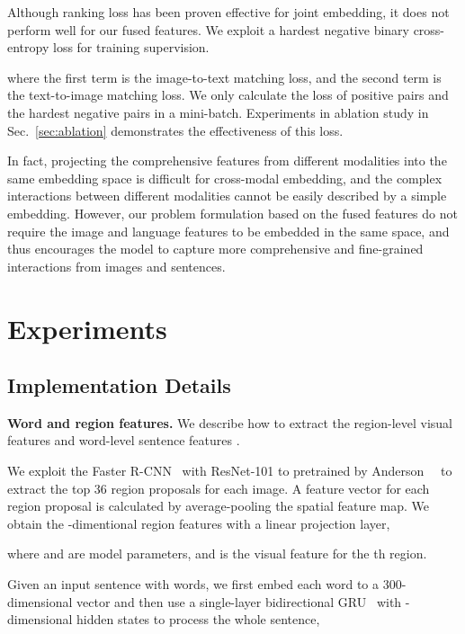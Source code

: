 \documentclass[10pt,twocolumn,letterpaper]{article}
\begin{document}
Although ranking loss has been proven effective for joint embedding, it does not perform well for our fused features. 
We exploit a hardest negative binary cross-entropy loss for training supervision. 

where the first term is the image-to-text matching loss, and the second term is the text-to-image matching loss. We only calculate the loss of positive pairs and the hardest negative pairs in a mini-batch. Experiments in ablation study in Sec.~\ref{sec:ablation} demonstrates the effectiveness of this loss.

In fact, projecting the comprehensive features from different modalities into the same embedding space is difficult for cross-modal embedding, and the complex interactions between different modalities cannot be easily described by a simple embedding. 
However, our problem formulation based on the fused features do not require the image and language features to be embedded in the same space, and thus encourages the model to capture more comprehensive and fine-grained interactions from images and sentences.

\section{Experiments}

\label{sec:experiment}
	


	
\subsection{Implementation Details}
\label{sec:implementdetail}

\noindent\textbf{Word and region features.}
We describe how to extract the region-level visual features  and word-level sentence features .

We exploit the Faster R-CNN~\cite{ren2015faster} with ResNet-101 to pretrained by Anderson~\etal~\cite{anderson2017bottom} to extract the top 36 region proposals for each image. A feature vector  for each region proposal is calculated by average-pooling the spatial feature map. We obtain the -dimentional region features with a linear projection layer,
\vspace{-2pt}

\vspace{-2pt}
where  and  are model parameters, and  is the visual feature for the th region.
	
Given an input sentence with  words, we first embed each word to a 300-dimensional vector  and then use a single-layer bidirectional GRU~\cite{chung2014GRU} with -dimensional hidden states to process the whole sentence,
\vspace{-2pt}
\end{document}
